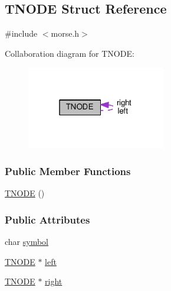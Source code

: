 \hypertarget{structTNODE}{\subsection{T\+N\+O\+D\+E Struct Reference}
\label{structTNODE}
}


{\ttfamily \#include $<$morse.\+h$>$}



Collaboration diagram for T\+N\+O\+D\+E\+:\nopagebreak
\begin{figure}[H]
\begin{center}
\leavevmode
\includegraphics[width=172pt]{structTNODE__coll__graph}
\end{center}
\end{figure}
\subsubsection*{Public Member Functions}
\begin{DoxyCompactItemize}
\item 
\hyperlink{structTNODE_a0f2d73dc28ef3be182dbb07464560a47}{T\+N\+O\+D\+E} ()
\end{DoxyCompactItemize}
\subsubsection*{Public Attributes}
\begin{DoxyCompactItemize}
\item 
char \hyperlink{structTNODE_a436db20d992c4227b8482603b4f76712}{symbol}
\item 
\hyperlink{structTNODE}{T\+N\+O\+D\+E} $\ast$ \hyperlink{structTNODE_ac8548d0ee2d54b914e0e07ab35375dba}{left}
\item 
\hyperlink{structTNODE}{T\+N\+O\+D\+E} $\ast$ \hyperlink{structTNODE_a4e135d9137519b2a4b89dbccb55ae967}{right}
\end{DoxyCompactItemize}


